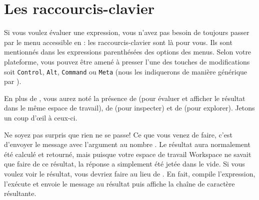 \documentclass[a4paper,10pt,twoside]{book}
\begin{document}

\section{Les raccourcis-clavier}

Si vous voulez évaluer une expression, vous n'avez pas besoin de
toujours passer par le menu accessible en \actclickant: les
raccourcis-clavier sont là pour vous. Ils sont mentionnés
dans les expressions parenthésées des options des menus. Selon
votre plateforme, vous pouvez être amené à presser l'une des
touches de modifications soit \texttt{Control}, \texttt{Alt},
\texttt{Command} ou \texttt{Meta} (nous les indiquerons de manière
générique par ).


En plus de , vous aurez noté la présence de
(pour évaluer et afficher le résultat dans le même espace de travail), 
de  (pour inspecter) et de  (pour
explorer). 
Jetons un coup d'\oe il à ceux-ci.


Ne soyez pas surpris que rien ne se passe!
Ce que vous venez de faire, c'est d'envoyer le message \ct{+} avec
l'argument  au nombre . Le résultat  aura
normalement été calculé et retourné, mais puisque votre espace de
travail Workspace ne savait que faire de ce résultat, la réponse a
simplement été jetée dans le vide. Si vous voulez voir le
résultat, vous devriez faire  au lieu
de . En fait,  compile l'expression,
l'exécute et envoie le message  au résultat puis
affiche la chaîne de caractère résultante.
\end{document}
